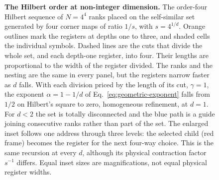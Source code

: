 \begin{figure}[t]
  \caption{\textbf{The Hilbert order at non-integer dimension.} The
    order-four Hilbert sequence of $N=4^4$ ranks placed on the
    self-similar set generated by four corner maps of ratio $1/s$, with
    $s=4^{1/d}$. Orange outlines mark the registers at depths one to
    three, and shaded cells the individual symbols. Dashed lines are the
    cuts that divide the whole set, and each depth-one register, into
    four. Their lengths are proportional to the width of the register
    divided. The ranks and the nesting are the same in every panel, but
    the registers narrow faster as $d$ falls. With each division priced
    by the length of its cut, $\gamma=1$, the exponent $\alpha=1-1/d$ of
    Eq.~\eqref{eq:geometric-exponent} falls from $1/2$ on Hilbert's
    square to zero, homogeneous refinement, at $d=1$. For $d<2$ the set
    is totally disconnected and the blue path is a guide joining
    consecutive ranks rather than part of the set. The enlarged inset
    follows one address through three levels: the selected child
    (red frame) becomes the register for the next four-way choice.
    This is the same recursion at every $d$, although its physical
    contraction factor $s^{-1}$ differs. Equal inset sizes are
    magnifications, not equal physical register widths.}
  \label{fig:fractional-hilbert}
\end{figure}
